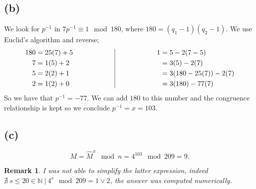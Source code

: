 \documentclass[12pt]{article}
\newtheorem*{remark}{Remark} \theoremstyle{remark}
\begin{document}
		\subsection*{(b)}
			We look for $p^{-1}$ in $7 p^{-1} \equiv 1 \mod 180$, where $180 = (q_{1} -1)(q_{2}-1)$. We use Euclid's algorithm and reverse; 
			\[
			\begin{align*}
				180 &= 25(7) + 5 \\
				7 &= 1(5) +2 \\
				5 &= 2(2) +1 \\
				2 &= 1(2) + 0
			\end{align*} 
			\qquad \qquad \qquad \vrule \qquad \qquad \qquad 
			\begin{align*}
			 1&= 5 - 2(7 - 5) \\
			 &= 3(5) - 2(7) \\
			 &= 3(180 - 25(7)) -2(7) \\
			 &= 3(180) -77(7)
			\end{align*}\]
			So we have that $p^{-1} = -77$. We can add $180$ to this number and the congruence relationship is kept so we conclude $p^{-1} = x = 103 $.
		\subsection*{(c)}
			$$ M = \hat{M}^{x} \mod n = 4^{103} \mod 209 = 9.$$
			\begin{remark}
				I was not able to simplify the latter expression, indeed $\nexists \ s \le 20 \in \mathbb{N} \ | \ 4^{s} \mod 209 = 1 \lor 2$, the answer was computed numerically.
			\end{remark}
			
\end{document}
